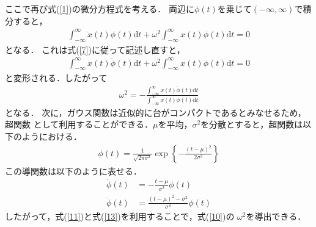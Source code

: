 \documentclass[a4paper,12pt]{jarticle}
\begin{document}
ここで再び式(\ref{1})の微分方程式を考える．
両辺に$\phi(t)$を乗じて$(-\infty,\infty)$で積分すると，
\begin{align}
 \int_{-\infty}^{\infty}\ddot{x}(t)\phi (t) \mbox{d}t+
 \omega^2 \int_{-\infty}^{\infty}x(t)\phi (t)\mbox{d}t=0\label{8}
\end{align}
となる．
これは式(\ref{7})に従って記述し直すと，
\begin{align}
 \int_{-\infty}^{\infty}x(t)\ddot{\phi} (t) \mbox{d}t+
 \omega^2 \int_{-\infty}^{\infty}x(t)\phi (t)\mbox{d}t=0\label{9}
\end{align}
と変形される．したがって
\begin{align}
\omega^2=-\frac{
 \int_{-\infty}^{\infty}x(t)\ddot{\phi} (t) \mbox{d}t}{
  \int_{-\infty}^{\infty}x(t)\phi (t)\mbox{d}t}\label{10}
\end{align}
となる．
次に，ガウス関数は近似的に台がコンパクトであるとみなせるため\cite{gaus}，超関数
として利用することができる．$\mu$を平均，$\sigma^2$を分散とすると，超関数は以下のようにおける．
\begin{align}
\phi(t)=\frac{1}{\sqrt{2\pi \sigma^2}}\exp \left\{-\frac{(t-\mu)^2}{2\sigma^2}\right\}\label{11}
\end{align}
この導関数は以下のように表せる．
\begin{align}
\dot{\phi}(t)&=-\frac{t-\mu}{\sigma^2}\phi(t)\label{12}\\
\ddot{\phi}(t)&=\frac{(t-\mu)^2-\sigma^2}{\sigma^4}\phi(t)\label{13}
\end{align}
したがって，式(\ref{11})と式(\ref{13})を利用することで，式(\ref{10})の
$\omega^2$を導出できる．
\end{document}
